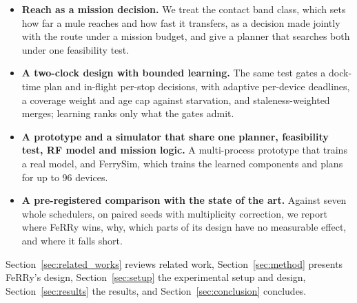 \documentclass[conference]{IEEEtran}
\newcommand{\sysname}{FeRRy}
\begin{document}
\begin{itemize}

\item \textbf{Reach as a mission decision.} We treat the contact band class,
which sets how far a mule reaches and how fast it transfers, as a decision made
jointly with the route under a mission budget, and give a planner that searches
both under one feasibility test.

\item \textbf{A two-clock design with bounded learning.} The same test gates a
dock-time plan and in-flight per-stop decisions, with adaptive per-device
deadlines, a coverage weight and age cap against starvation, and
staleness-weighted merges; learning ranks only what the gates admit.

\item \textbf{A prototype and a simulator that share one planner,
feasibility test, RF model and mission logic.} A
multi-process prototype that trains a real model, and FerrySim, which trains the
learned components and plans for up to 96 devices.

\item \textbf{A pre-registered comparison with the state of the art.} Against
seven whole schedulers, on paired seeds with multiplicity correction, we report
where \sysname{} wins, why, which parts of its design have no measurable effect,
and where it falls short.

\end{itemize}

Section~\ref{sec:related_works} reviews related work,
Section~\ref{sec:method} presents \sysname{}'s design,
Section~\ref{sec:setup} the experimental setup and design,
Section~\ref{sec:results} the results, and Section~\ref{sec:conclusion}
concludes.


\newcommand{\cmarkc}{\cellcolor{goodgreen}\textcolor{black!55}{\scriptsize$\checkmark$}}
\newcommand{\xmarkc}{\cellcolor{badred}\textcolor{black!40}{\scriptsize$\times$}}
\newcommand{\tmarkc}{\cellcolor{nayellow}\textcolor{black!65}{\scriptsize$\triangle$}}
\newcommand{\cmarkF}{\cellcolor{ferrygreen}\textcolor{white}{\textbf{\scriptsize$\checkmark$}}}
\end{document}
